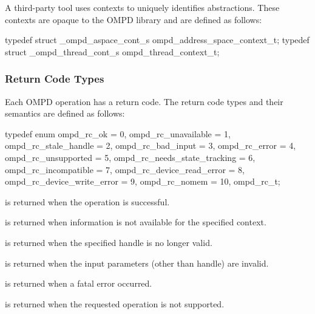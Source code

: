 A third-party tool uses contexts to uniquely  identifies abstractions. These contexts are opaque to 
the OMPD library and are defined as follows:

\format

\begin{ccppspecific}
\begin{ompSyntax}
typedef struct _ompd_aspace_cont_s ompd_address_space_context_t;
typedef struct _ompd_thread_cont_s ompd_thread_context_t;
\end{ompSyntax}
\end{ccppspecific}


\subsubsection{Return Code Types}
\label{subsubsec:ompd_rc_t}

Each OMPD operation has a return code. The return code types and their semantics are defined as 
follows:

\format

\begin{ccppspecific}
\begin{ompSyntax}
typedef enum {
  ompd_rc_ok = 0,
  ompd_rc_unavailable = 1,
  ompd_rc_stale_handle = 2,
  ompd_rc_bad_input = 3,
  ompd_rc_error = 4,
  ompd_rc_unsupported = 5,
  ompd_rc_needs_state_tracking = 6,
  ompd_rc_incompatible = 7,
  ompd_rc_device_read_error = 8,
  ompd_rc_device_write_error = 9,
  ompd_rc_nomem = 10,
} ompd_rc_t;	
\end{ompSyntax}
\end{ccppspecific}


\descr
\label{ompd:ompd_rc_ok}
 is returned when the operation is successful.

\label{ompd:ompd_rc_unavailable}
 is returned when 
information is not available for the specified context.

\label{ompd:ompd_rc_stale_handle}
 is returned when
the specified handle is no longer valid.

\label{ompd:ompd_rc_bad_input}
 is returned when
the input parameters (other than handle) are invalid. 

\label{ompd:ompd_rc_error}
 is returned when
a fatal error occurred.

\label{ompd:ompd_rc_unsupported}
 is returned when
the requested operation is not supported.

